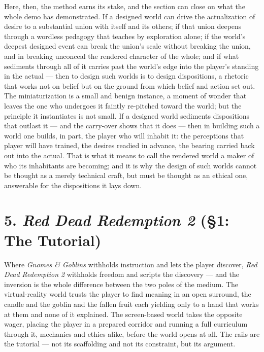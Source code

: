 \documentclass{article}
\begin{document}
Here, then, the method earns its stake, and the section can close on what the whole demo has demonstrated. If a designed world can drive the actualization of desire to a substantial union with itself and its others; if that union deepens through a wordless pedagogy that teaches by exploration alone; if the world's deepest designed event can break the union's scale without breaking the union, and in breaking unconceal the rendered character of the whole; and if what sediments through all of it carries past the world's edge into the player's standing in the actual — then to design such worlds is to design dispositions, a rhetoric that works not on belief but on the ground from which belief and action set out. The miniaturization is a small and benign instance, a moment of wonder that leaves the one who undergoes it faintly re-pitched toward the world; but the principle it instantiates is not small. If a designed world sediments dispositions that outlast it — and the carry-over shows that it does — then in building such a world one builds, in part, the player who will inhabit it: the perceptions that player will have trained, the desires readied in advance, the bearing carried back out into the actual. That is what it means to call the rendered world a maker of who its inhabitants are becoming; and it is why the design of such worlds cannot be thought as a merely technical craft, but must be thought as an ethical one, answerable for the dispositions it lays down.

\bigskip

\section*{5. \textit{Red Dead Redemption 2} (§1: The Tutorial)}

Where \textit{Gnomes \& Goblins} withholds instruction and lets the player discover, \textit{Red Dead Redemption 2} withholds freedom and scripts the discovery — and the inversion is the whole difference between the two poles of the medium. The virtual-reality world trusts the player to find meaning in an open surround, the candle and the goblin and the fallen fruit each yielding only to a hand that works at them and none of it explained. The screen-based world takes the opposite wager, placing the player in a prepared corridor and running a full curriculum through it, mechanics and ethics alike, before the world opens at all. The rails are the tutorial — not its scaffolding and not its constraint, but its argument.
\end{document}
